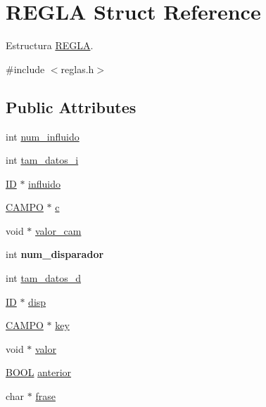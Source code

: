 \hypertarget{structREGLA}{
\section{REGLA Struct Reference}
\label{structREGLA}
}


Estructura \hyperlink{structREGLA}{REGLA}.  




{\ttfamily \#include $<$reglas.h$>$}

\subsection*{Public Attributes}
\begin{DoxyCompactItemize}
\item 
int \hyperlink{structREGLA_a7d11e3a4fbf9254b9e59605d8037f0fa}{num\_\-influido}
\item 
int \hyperlink{structREGLA_a016c1d6ba88a9f85f03cc013ea2743f3}{tam\_\-datos\_\-i}
\item 
\hyperlink{tipos_8h_a483fb3895d39b2ee95d50073243d077e}{ID} $\ast$ \hyperlink{structREGLA_aba3a533e68fa21a4d3fef8122b945699}{influido}
\item 
\hyperlink{reglas_8h_ac31209120b6a535e5f3435164fed75ca}{CAMPO} $\ast$ \hyperlink{structREGLA_a79f8e5ff3abf4f287eb43a7fe9690613}{c}
\item 
void $\ast$ \hyperlink{structREGLA_a980484a60eaa5dd30bbc934c6b7a79cc}{valor\_\-cam}
\item 
\hypertarget{structREGLA_add5003effad95b5259f9524b1b9d1033}{
int {\bfseries num\_\-disparador}}
\label{structREGLA_add5003effad95b5259f9524b1b9d1033}

\item 
int \hyperlink{structREGLA_a85085eaff016bd2aa9fd04e066706082}{tam\_\-datos\_\-d}
\item 
\hyperlink{tipos_8h_a483fb3895d39b2ee95d50073243d077e}{ID} $\ast$ \hyperlink{structREGLA_ae4997a4fd9c0b9e649cbe73b6c9283c8}{disp}
\item 
\hyperlink{reglas_8h_ac31209120b6a535e5f3435164fed75ca}{CAMPO} $\ast$ \hyperlink{structREGLA_a03be3583ba759e8df930b76b66ad9442}{key}
\item 
void $\ast$ \hyperlink{structREGLA_ab25ddb664e80c62a9025cbcbc9f0c03c}{valor}
\item 
\hyperlink{tipos_8h_a3e5b8192e7d9ffaf3542f1210aec18dd}{BOOL} \hyperlink{structREGLA_ac7c717fa3194096120eecdad83a7a789}{anterior}
\item 
char $\ast$ \hyperlink{structREGLA_a5a95ee6d2693626c07c680052a689682}{frase}
\end{DoxyCompactItemize}


